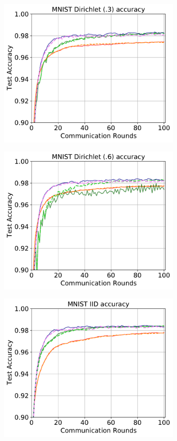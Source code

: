 \documentclass{article} %
\begin{document}
\begin{figure}[ht!]
\begin{subfigure}{.5\textwidth}
  \centering
  \includegraphics[width=.8\linewidth]{100perfig/mnist_0.3.pdf}
  \label{fig:sub11}
\end{subfigure}
\begin{subfigure}{.5\textwidth}
  \centering
  \includegraphics[width=.8\linewidth]{100perfig/mnist_0.6.pdf}
  \label{fig:sub12}
\end{subfigure}
\begin{subfigure}{.5\textwidth}
  \centering
  \includegraphics[width=.8\linewidth]{100perfig/mnist_iid.pdf}

\end{subfigure}
\end{figure}
\end{document}
